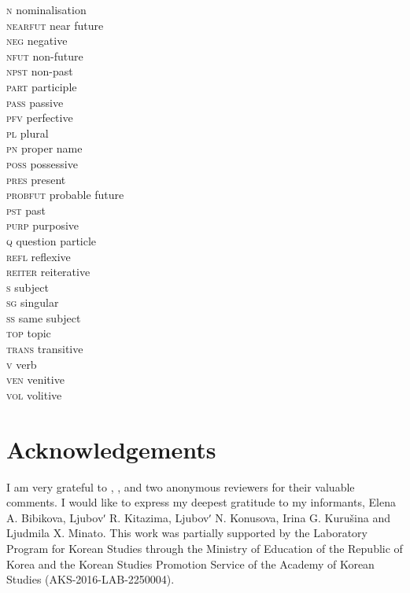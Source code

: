 \documentclass[output=paper,colorlinks,citecolor=brown]{langscibook}
\begin{document}
\begin{multicols}{2}
\begin{tabbing}
\textsc{n} \> nominalisation\\
\textsc{nearfut} \> near future\\
\textsc{neg} \> negative\\
\textsc{nfut} \> non-future\\
\textsc{npst} \> non-past\\
\textsc{part} \> participle\\
\textsc{pass} \> passive\\
\textsc{pfv} \> perfective\\
\textsc{pl} \> plural\\
\textsc{pn} \> proper name\\
\textsc{poss} \> possessive\\
\textsc{pres} \> present\\
\textsc{probfut} \> probable future\\
\textsc{pst} \> past\\
\textsc{purp} \> purposive\\
\textsc{q} \> question particle\\
\textsc{refl} \> reflexive\\
\textsc{reiter} \> reiterative\\
\textsc{s} \> subject\\
\textsc{sg} \> singular\\
\textsc{ss} \> same subject\\
\textsc{top} \> topic\\
\textsc{trans} \> transitive\\
\textsc{v} \> verb\\
\textsc{ven} \> venitive\\
\textsc{vol} \> volitive\\
\end{tabbing}
\end{multicols}

\section*{Acknowledgements}

I am very grateful to , ,  and two anonymous reviewers for their valuable comments. I would like to express my deepest gratitude to my  informants, Elena A. Bibikova, Ljubovʹ R. Kitazima, Ljubovʹ N. Konusova, Irina G. Kurušina and Ljudmila X. Minato. This work was partially supported by the Laboratory Program for Korean Studies through the Ministry of Education of the Republic of Korea and the Korean Studies Promotion Service of the Academy of Korean Studies (AKS-2016-LAB-2250004).

{\sloppy\printbibliography[heading=subbibliography,notkeyword=this]}
\end{document}
